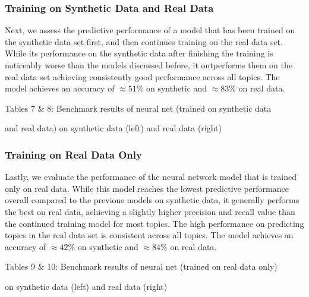 \documentclass[11pt]{article}
\begin{document}
\subsubsection{Training on Synthetic Data and Real Data}
Next, we assess the predictive performance of a model that has been trained on the synthetic data set first, and then continues training on the real data set. While its performance on the synthetic data after finishing the training is noticeably worse than the models discussed before, it outperforms them on the real data set achieving consistently good performance across all topics.
The model achieves an accuracy of $\approx 51\%$ on synthetic and $\approx 83\%$ on real data.

\begin{center}

\qquad

\end{center}
\begin{center}
Tables 7 \& 8: Benchmark results of neural net (trained on synthetic data 

and real data) on synthetic data (left) and real data (right)
\end{center}

\subsubsection{Training on Real Data Only}
Lastly, we evaluate the performance of the neural network model that is trained only on real data. While this model reaches the lowest predictive performance overall compared to the previous models on synthetic data, it generally performs the best on real data, achieving a slightly higher precision and recall value than the continued training model for most topics. The high performance on predicting topics in the real data set is consistent across all topics.
The model achieves an accuracy of $\approx 42\%$ on synthetic and $\approx 84\%$ on real data.

\begin{center}

\qquad

\end{center}
\begin{center}
Tables 9 \& 10: Benchmark results of neural net (trained on real data only)

 on synthetic data (left) and real data (right)
\end{center}
\end{document}
